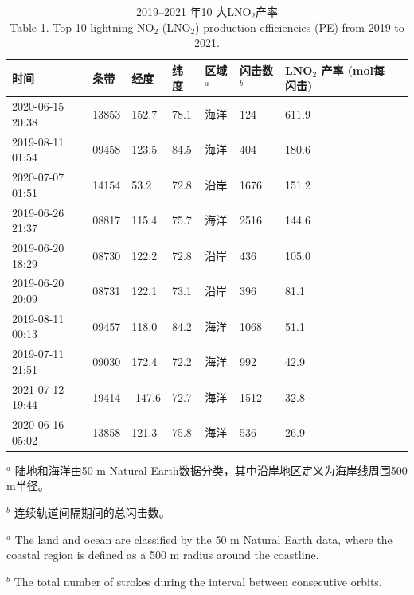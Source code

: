\begin{table}[!htbp]
\centering
\caption{2019--2021 年10 大LNO$_2$产率 \\
Table \ref{table:arctic_pe_lno2}.
Top 10 lightning NO$_2$ (LNO$_2$) production efficiencies (PE) from 2019 to 2021.}
\label{table:arctic_pe_lno2}
\footnotesize
{\centering
\begin{tabular}{llllllll}
\hline
时间 &       条带 &   经度 &   纬度 &
区域$^a$ &
闪击数$^b$  & \shortstack{LNO$_2$ 产率 \\ (mol每闪击)} \\
\hline
2020-06-15 20:38 &  13853 &      152.7 &      78.1 &       海洋 &         124 &    611.9 \\
2019-08-11 01:54 &  09458 &      123.5 &      84.5 &       海洋 &         404 &    180.6 \\
2020-07-07 01:51 &  14154 &       53.2 &      72.8 &       沿岸 &        1676 &    151.2 \\
2019-06-26 21:37 &  08817 &      115.4 &      75.7 &       海洋 &        2516 &    144.6 \\
2019-06-20 18:29 &  08730 &      122.2 &      72.8 &       沿岸 &         436 &    105.0 \\
2019-06-20 20:09 &  08731 &      122.1 &      73.1 &       沿岸 &         396 &     81.1 \\
2019-08-11 00:13 &  09457 &      118.0 &      84.2 &       海洋 &        1068 &     51.1 \\
2019-07-11 21:51 &  09030 &      172.4 &      72.2 &       海洋 &         992 &     42.9 \\
2021-07-12 19:44 &  19414 &     -147.6 &      72.7 &       海洋 &        1512 &     32.8 \\
2020-06-16 05:02 &  13858 &      121.3 &      75.8 &       海洋 &         536 &     26.9 \\
\hline
\end{tabular}
\par }
\begin{tablenotes}
\footnotesize
\item $^a$ 陆地和海洋由50 m Natural Earth数据分类，其中沿岸地区定义为海岸线周围500 m半径。
\item $^b$ 连续轨道间隔期间的总闪击数。
\item $^a$ The land and ocean are classified by the 50 m Natural Earth data, where the coastal region is defined as a 500 m radius around the coastline.
\item $^b$ The total number of strokes during the interval between consecutive orbits.
\end{tablenotes}
\end{table}


